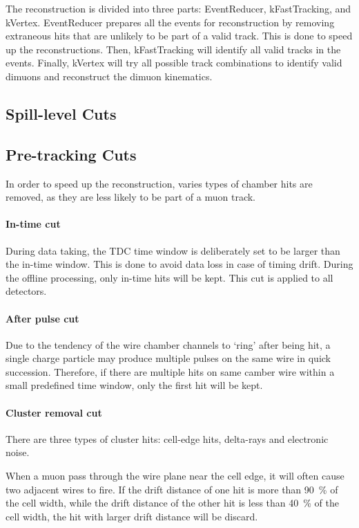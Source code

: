 \documentclass[../main.tex]{subfiles}
\begin{document}
The reconstruction is divided into three parts: EventReducer, kFastTracking, and kVertex.
EventReducer prepares all the events for reconstruction by removing extraneous hits that are
unlikely to be part of a valid track. This is done to speed up the reconstructions. Then, kFastTracking
will identify all valid tracks in the events. Finally, kVertex will try all possible track combinations
to identify valid dimuons and reconstruct the dimuon kinematics.

\subsection{Spill-level Cuts}

\subsection{Pre-tracking Cuts}
In order to speed up the reconstruction, varies types of chamber hits are removed, as
they are less likely to be part of a muon track.

\paragraph{In-time cut}
During data taking, the TDC time window is deliberately set to be larger than the in-time
window. This is done to avoid data loss in case of timing drift\cite{daniel-4924}.
During the offline processing, only in-time hits will be kept. This cut is applied to
all detectors.

\paragraph{After pulse cut}
Due to the tendency of the wire chamber channels to `ring' after being hit,
a single charge particle may produce multiple pulses on the same
wire in quick succession. Therefore, if there are multiple hits on same camber wire
within a small predefined time window, only the first hit will be kept.

\paragraph{Cluster removal cut}
There are three types of cluster hits: cell-edge hits, delta-rays and electronic noise.

When a muon pass through the wire plane near the cell edge, it will often cause two adjacent
wires to fire. If the drift distance of one hit is more than \SI{90}{\percent} of the cell width,
while the drift distance of the other hit is less than \SI{40}{\percent} of the cell width, the hit
with larger drift distance will be discard.
\end{document}
